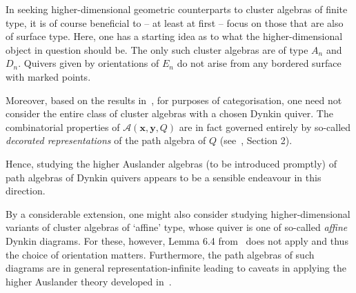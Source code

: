 \documentclass[a4paper,oneside,svgnames,draft]{amsart}
\theoremstyle{plain}
\theoremstyle{definition}
\begin{document}
 In seeking higher-dimensional geometric counterparts to cluster algebras of
 finite type, it is of course beneficial to -- at least at first -- focus on
 those that are also of surface type. Here, one has a starting idea as to what
 the higher-dimensional object in question should be. The only such cluster
 algebras are of type $A_n$ and $D_n$.  Quivers given by orientations of $E_n$
 do not arise from any bordered surface with marked points.  

 Moreover, based on the results in~\cite{bma}, for purposes of categorisation,
 one need not consider the entire class of cluster algebras with a chosen Dynkin
 quiver. The combinatorial properties of $\mathcal{A}(\mathbf{x},\mathbf{y},Q)$
 are in fact governed entirely by so-called \emph{decorated representations} of
 the path algebra of $Q$ (see~\cite{bma}, Section 2).

 Hence, studying the higher Auslander algebras (to be introduced promptly) of
 path algebras of Dynkin quivers appears to be a sensible endeavour in this
 direction.

 By a considerable extension, one might also consider studying
 higher-dimensional variants of cluster algebras of `affine' type, whose quiver
 is one of so-called \emph{affine} Dynkin diagrams. For these, however, Lemma
 6.4 from~\cite{fst} does not apply and thus the choice of orientation matters.
 Furthermore, the path algebras of such diagrams are in general
 representation-infinite leading to caveats in applying the higher Auslander
 theory developed in~\cite{iyama}.
\end{document}
